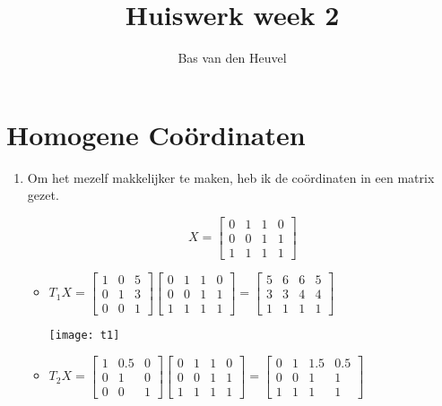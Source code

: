 \documentclass{article}
\title{Huiswerk week 2}
\author{Bas van den Heuvel}
\begin{document}
\maketitle

\section{Homogene Co\"ordinaten}
\begin{enumerate}

\item Om het mezelf makkelijker te maken, heb ik de co\"ordinaten in een matrix
gezet.

$$ X = \begin{bmatrix}
0 & 1 & 1 & 0 \\
0 & 0 & 1 & 1 \\
1 & 1 & 1 & 1
\end{bmatrix} $$

\begin{itemize}

\item $ T_1 X = \begin{bmatrix}
1 & 0 & 5 \\
0 & 1 & 3 \\
0 & 0 & 1
\end{bmatrix} \begin{bmatrix}
0 & 1 & 1 & 0 \\
0 & 0 & 1 & 1 \\
1 & 1 & 1 & 1
\end{bmatrix} = \begin{bmatrix}
5 & 6 & 6 & 5 \\
3 & 3 & 4 & 4 \\
1 & 1 & 1 & 1
\end{bmatrix} $

\texttt{[image: t1]}

\item $ T_2 X = \begin{bmatrix}
1 & 0.5 & 0 \\
0 & 1 & 0 \\
0 & 0 & 1
\end{bmatrix} \begin{bmatrix}
0 & 1 & 1 & 0 \\
0 & 0 & 1 & 1 \\
1 & 1 & 1 & 1
\end{bmatrix} = \begin{bmatrix}
0 & 1 & 1.5 & 0.5 \\
0 & 0 & 1 & 1 \\
1 & 1 & 1 & 1
\end{bmatrix} $


\end{itemize}
\end{enumerate}
\end{document}
